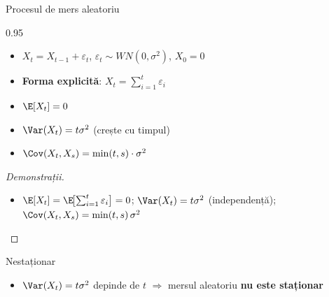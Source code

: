 \documentclass[9pt, aspectratio=169, t]{beamer}
\begin{document}
\begin{frame}{Procesul de mers aleatoriu}
    \begin{cminipage}{0.95\textwidth}
        \small
        \vspace{-3mm}
        \begin{defn}
            \begin{itemize}\setlength{\itemsep}{0pt}
                \item $X_t = X_{t-1} + \varepsilon_t$, \; $\varepsilon_t \sim WN(0, \sigma^2)$, $X_0 = 0$
                \item \textbf{Forma explicită}: $X_t = \sum_{i=1}^{t} \varepsilon_i$
            \end{itemize}
        \end{defn}
        \vspace{-2mm}
        {\footnotesize
        \begin{prop}[Proprietăți]
            \begin{itemize}\setlength{\itemsep}{0pt}
                \item $\E[X_t] = 0$
                \item $\Var(X_t) = t\sigma^2$ (crește cu timpul)
                \item $\Cov(X_t, X_s) = \min(t, s) \cdot \sigma^2$
            \end{itemize}
        \end{prop}
        }
        \vspace{-2mm}
        {\scriptsize
        \begin{proof}[Demonstrații]
            \begin{itemize}\setlength{\itemsep}{0pt}
                \item $\E[X_t] = \E\!\bigl[\sum_{i=1}^{t} \varepsilon_i\bigr] = 0$; \;
                      $\Var(X_t) = t\sigma^2$ (independență); \;
                      $\Cov(X_t, X_s) = \min(t,s)\,\sigma^2$
            \end{itemize}
        \end{proof}
        }
        \vspace{-4mm}
        \begin{alertblock}{Nestaționar}
            \begin{itemize}\setlength{\itemsep}{0pt}
                \item $\Var(X_t) = t\sigma^2$ depinde de $t$ $\Rightarrow$ mersul aleatoriu \textbf{nu este staționar}
            \end{itemize}
        \end{alertblock}
    \end{cminipage}
\end{frame}
\end{document}
